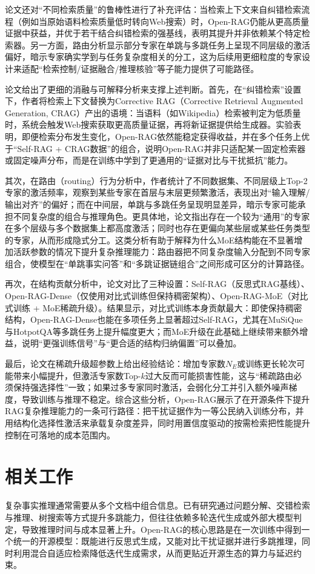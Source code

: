 论文还对“不同检索质量”的鲁棒性进行了补充评估：当检索上下文来自纠错检索流程（例如当原始语料检索质量低时转向Web搜索）时，Open-RAG仍能从更高质量证据中获益，并优于若干结合纠错检索的强基线，表明其提升并非依赖某个特定检索器。另一方面，路由分析显示部分专家在单跳与多跳任务上呈现不同层级的激活偏好，暗示专家确实学到与任务复杂度相关的分工，这为后续用更细粒度的专家设计来适配“检索控制/证据融合/推理核验”等子能力提供了可能路径。

论文给出了更细的消融与可解释分析来支撑上述判断。首先，在“纠错检索”设置下，作者将检索上下文替换为Corrective RAG（Corrective Retrieval Augmented Generation, CRAG）产出的语境：当语料（如Wikipedia）检索被判定为低质量时，系统会触发Web搜索获取更高质量证据，再将新证据提供给生成器。实验表明，即便检索分布发生变化，Open-RAG依然能稳定获得收益，并在多个任务上优于“Self-RAG + CRAG数据”的组合，说明Open-RAG并非只适配某一固定检索器或固定噪声分布，而是在训练中学到了更通用的“证据对比与干扰抵抗”能力。

其次，在路由（routing）行为分析中，作者统计了不同数据集、不同层级上Top-2专家的激活频率，观察到某些专家在首层与末层更频繁激活，表现出对“输入理解/输出对齐”的偏好；而在中间层，单跳与多跳任务呈现明显差异，暗示专家可能承担不同复杂度的组合与推理角色。更具体地，论文指出存在一个较为“通用”的专家在多个层级与多个数据集上都高度激活；同时也存在更偏向某些层或某些任务类型的专家，从而形成隐式分工。这类分析有助于解释为什么MoE结构能在不显著增加活跃参数的情况下提升复杂推理能力：路由器把不同复杂度输入分配到不同专家组合，使模型在“单跳事实问答”和“多跳证据链组合”之间形成可区分的计算路径。

再次，在结构贡献分析中，论文对比了三种设置：Self-RAG（反思式RAG基线）、Open-RAG-Dense（仅使用对比式训练但保持稠密架构）、Open-RAG-MoE（对比式训练 + MoE稀疏升级）。结果显示，对比式训练本身贡献最大：即使保持稠密结构，Open-RAG-Dense也能在多项任务上显著超过Self-RAG，尤其在MuSiQue与HotpotQA等多跳任务上提升幅度更大；而MoE升级在此基础上继续带来额外增益，说明“更强训练信号”与“更合适的结构归纳偏置”可以叠加。

最后，论文在稀疏升级超参数上给出经验结论：增加专家数$N_E$或训练更长轮次可能带来小幅提升，但激活专家数Top-$k$过大反而可能损害性能，这与“稀疏路由必须保持强选择性”一致；如果过多专家同时激活，会弱化分工并引入额外噪声梯度，导致训练与推理不稳定。综合这些分析，Open-RAG展示了在开源条件下提升RAG复杂推理能力的一条可行路径：把干扰证据作为一等公民纳入训练分布，并用结构化选择性激活来承载复杂度差异，同时用置信度驱动的按需检索把性能提升控制在可落地的成本范围内。
 
\section{相关工作}
复杂事实推理通常需要从多个文档中组合信息。已有研究通过问题分解、交错检索与推理、树搜索等方式提升多跳能力，但往往依赖多轮迭代生成或外部大模型判定，导致推理时间与成本显著上升。Open-RAG的核心思路是在一次训练中得到一个统一的开源模型：既能进行反思式生成，又能对比干扰证据并进行多跳推理，同时利用混合自适应检索降低迭代生成需求，从而更贴近开源生态的算力与延迟约束。

